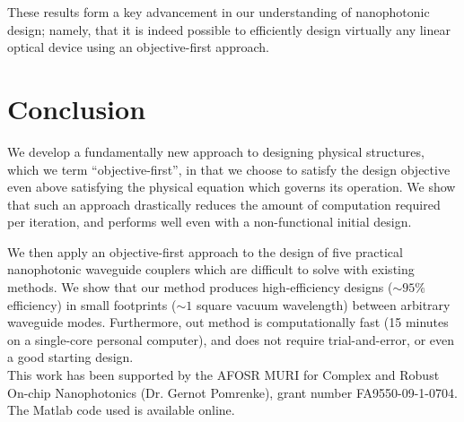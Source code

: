 \documentclass[letterpaper,10pt]{article}
\begin{document}
These results form a key advancement in our understanding of 
    nanophotonic design; namely, 
    that it is indeed possible to efficiently design
    virtually any linear optical device using an objective-first approach.

\section{Conclusion}
We develop a fundamentally new approach to designing physical structures,
    which we term ``objective-first'', 
    in that we choose to satisfy the design objective 
    even above satisfying the physical equation which governs its operation.
We show that such an approach drastically reduces the
    amount of computation required per iteration, and 
    performs well even with a non-functional initial design.

We then apply an objective-first approach to the design of 
    five practical nanophotonic waveguide couplers which are difficult
    to solve with existing methods. 
We show that our method produces
    high-efficiency designs ($\sim 95\%$ efficiency) 
    in small footprints ($\sim 1$ square vacuum wavelength)
    between arbitrary waveguide modes.
Furthermore, out method
    is computationally fast (15 minutes on a single-core personal computer), and
    does not require trial-and-error, or even 
    a good starting design.\\

This work has been supported by the 
    AFOSR MURI for Complex and Robust On-chip Nanophotonics 
    (Dr. Gernot Pomrenke), grant number FA9550-09-1-0704.
The Matlab code used is available online\cite{code}.
\end{document}

